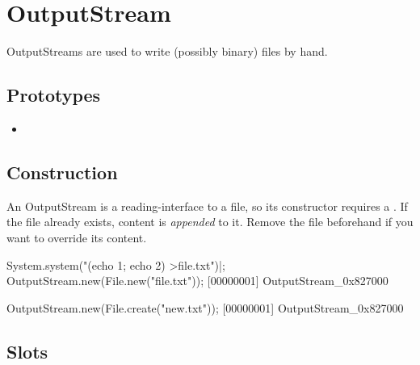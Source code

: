 \section{OutputStream}

OutputStreams are used to write (possibly binary) files by hand.

\subsection{Prototypes}
\begin{itemize}
\item {}
\end{itemize}

\subsection{Construction}

An OutputStream is a reading-interface to a file, so its constructor
requires a .  If the file already exists, content is
\emph{appended} to it.  Remove the file beforehand if you want to
override its content.

\begin{urbiscript}
System.system("(echo 1; echo 2) >file.txt")|;
OutputStream.new(File.new("file.txt"));
[00000001] OutputStream_0x827000

OutputStream.new(File.create("new.txt"));
[00000001] OutputStream_0x827000
\end{urbiscript}

\subsection{Slots}

